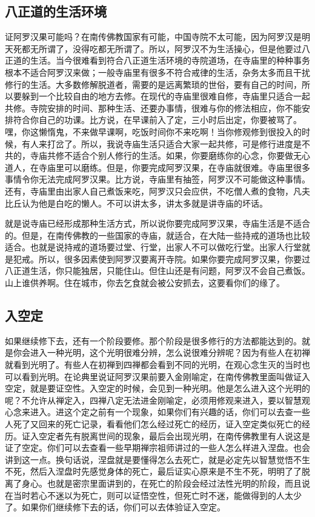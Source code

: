 \documentclass{book}
\begin{document}
\subsection{八正道的生活环境}

证阿罗汉果可能吗？在南传佛教国家有可能，中国寺院不太可能，因为阿罗汉是明天死都无所谓了，没得吃都无所谓了。所以，阿罗汉不为生活操心，但是他要过八正道的生活。当今很难看到符合八正道生活环境的寺院道场，在寺庙里的种种事务根本不适合阿罗汉来做；一般寺庙里有很多不符合戒律的生活，杂务太多而且干扰修行的生活。大多数修解脱道者，需要的是远离繁琐的世俗，要有自己的时间，所以要躲到一个比较自由的地方去修。在现代的寺庙里很难自修，寺庙里只适合一起共修。寺院安排的时间、那种生活、还要办事情，很难与你的修法相应，你不能安排符合你自己的功课。比方说，在早课前入了定，三小时后出定，你要被骂了。嘿，你这懒惰鬼，不来做早课啊，吃饭时间你不来吃啊！当你修观修到很投入的时候，有人来打岔了。所以，我说寺庙生活只适合大家一起共修，可是修行进度是不共的，寺庙共修不适合个别人修行的生活。如果，你要磨练你的心念，你要做无心道人，在寺庙里可以磨练。但是，你要完成阿罗汉果，在寺庙就很难。寺庙里很多事情令你无法完成阿罗汉果。比方说，寺庙里有抽签，阿罗汉不可能做这种事情。还有，寺庙里由出家人自己煮饭来吃，阿罗汉只会应供，不吃僧人煮的食物，凡夫比丘认为他是白吃的懒人。不可以讲太多，讲太多就是讲寺庙的坏话。

就是说寺庙已经形成那种生活方式，所以说你要完成阿罗汉果，寺庙生活是不适合的。但是，在南传佛教的一些国家的寺庙，就适合，在大陆一些持戒的道场也比较适合。也就是说持戒的道场要过堂、行堂，出家人不可以做吃行堂。出家人行堂就是犯戒。所以，很多因素使到阿罗汉要离开寺院。如果你要完成阿罗汉果，你要过八正道生活，你只能独居，只能住山。但住山还是有问题，阿罗汉不会自己煮饭。山上谁供养啊。住在城市，你去乞食就会被公安抓去，这要看你们的缘了。

\subsection{入空定}

如果继续修下去，还有一个阶段要修。那个阶段是很多修行的方法都能达到的。就是你会进入一种光明，这个光明很难分辨，怎么说很难分辨呢？因为有些人在初禅就看到光明了。有些人在初禅到四禅都会看到不同的光明，在观心念生灭的当时也可以看到光明。在论典里说证阿罗汉果前要入金刚喻定，在南传佛教里面叫做证入空定，就是要证空性。入空定的时候，会见到一种光明。他是怎么进入这个光明的呢？不允许从禅定入，四禅八定无法进金刚喻定，必须用修观来进入，要以智慧观心念来进入。进这个定之前有一个现象，如果你们有兴趣的话，你们可以去查一些人死了又回来的死亡记录，看看他们怎么经过死亡的经历，证入空定类似死亡的经历。证入空定者先有脱离世间的现象，最后会出现光明，在南传佛教里有人说这是证了空定。你们可以去查看一些早期禅宗祖师讲过的一些人怎么样进入涅盘。也会讲到这一点。换句话说，涅盘就是要懂得怎么去死亡，就是必定先以智慧觉悟不生不死，然后入涅盘时先感觉身体的死亡，最后证实心原来是不生不死，明明了了脱离了身心。也就是密宗里面讲到的，在死亡的阶段会经过法性光明的阶段，而且说在当时若心不迷以为死亡，则可以证悟空性，但死亡时不迷，能做得到的人太少了。如果你们继续修下去的话，你们可以去体验证入空定。
\end{document}
